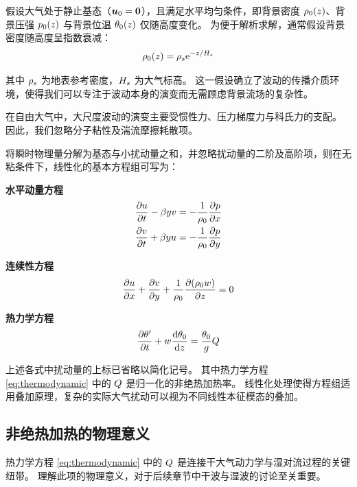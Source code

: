 假设大气处于静止基态（$\bm{u}_0 = \bm{0}$），且满足水平均匀条件，即背景密度 $\rho_0(z)$、背景压强 $p_0(z)$ 与背景位温 $\theta_0(z)$ 仅随高度变化。
为便于解析求解，通常假设背景密度随高度呈指数衰减：
\begin{equation}
    \rho_0(z) = \rho_s \mathrm{e}^{-z/H_s}
    \label{eq:background_density}
\end{equation}

其中 $\rho_s$ 为地表参考密度，$H_s$ 为大气标高。
这一假设确立了波动的传播介质环境，使得我们可以专注于波动本身的演变而无需顾虑背景流场的复杂性。

在自由大气中，大尺度波动的演变主要受惯性力、压力梯度力与科氏力的支配。
因此，我们忽略分子粘性及湍流摩擦耗散项。

将瞬时物理量分解为基态与小扰动量之和，并忽略扰动量的二阶及高阶项，则在无粘条件下，线性化的基本方程组可写为：

\textbf{水平动量方程}
\begin{align}
    \pde{u}{\timevar} - \rossby y v &= -\frac{1}{\density_0}\pde{\pressure}{x} \label{eq:momentum_u} \\
    \pde{v}{\timevar} + \rossby y u &= -\frac{1}{\density_0}\pde{\pressure}{y} \label{eq:momentum_v}
\end{align}

\textbf{连续性方程}
\begin{equation}
    \pde{u}{x} + \pde{v}{y} + \frac{1}{\density_0}\pde{(\density_0 w)}{z} = 0
    \label{eq:continuity}
\end{equation}

\textbf{热力学方程}
\begin{equation}
    \pde{\ptemp^\prime}{\timevar} + w \ode{\ptemp_0}{z} = \frac{\ptemp_0}{\gravityconst} \nonadheat
    \label{eq:thermodynamic}
\end{equation}

上述各式中扰动量的上标已省略以简化记号。
其中热力学方程 \eqref{eq:thermodynamic} 中的 $Q$ 是归一化的非绝热加热率。
线性化处理使得方程组适用叠加原理，复杂的实际大气扰动可以视为不同线性本征模态的叠加。

\subsection{非绝热加热的物理意义}
\label{subsec:heating_interpretation}

热力学方程 \eqref{eq:thermodynamic} 中的 $Q$ 是连接干大气动力学与湿对流过程的关键纽带。
理解此项的物理意义，对于后续章节中干波与湿波的讨论至关重要。

